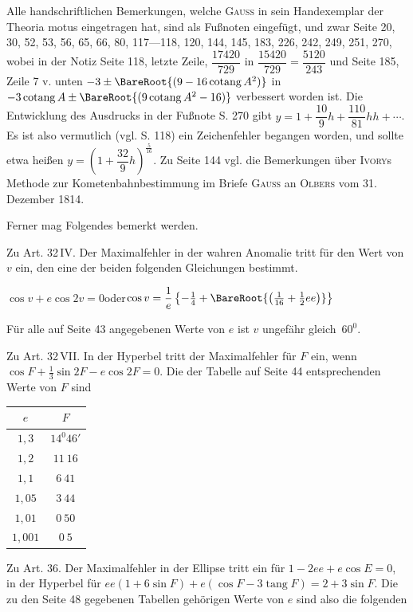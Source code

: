 Alle handschriftlichen Bemerkungen, welche \textsc{Gauss} in sein Handexemplar der
Theoria motus eingetragen hat, sind als Fußnoten eingefügt, und zwar Seite 20, 30, 52,
53, 56, 65, 66, 80, 117---118, 120, 144, 145, 183, 226, 242, 249, 251, 270, wobei in der
Notiz Seite 118, letzte Zeile, $\dfrac{17420}{729}$ in $\dfrac{15420}{729} =
\dfrac{5120}{243}$ und Seite 185, Zeile 7 v. unten $-3 \pm \BareRoot{(9-16\operatorname{cotang} A^2)}$ in
$-3\operatorname{cotang} A \pm \BareRoot{(9\operatorname{cotang} A^2-16)}$ verbessert worden ist. Die Entwicklung des
Ausdrucks in der Fußnote S. 270 gibt $y = 1 + \dfrac{10}{9}h + \dfrac{110}{81}hh +
\cdots$. Es ist also vermutlich (vgl. S. 118) ein Zeichenfehler begangen worden, und
sollte etwa heißen $y = \left(1+\dfrac{32}{9}h\right)^{\frac{5}{16}}$. Zu Seite 144
vgl. die Bemerkungen über \textsc{Ivory}s Methode zur Kometenbahnbestimmung im Briefe
\textsc{Gauss} an \textsc{Olbers} vom 31. Dezember 1814.

Ferner mag Folgendes bemerkt werden.

Zu Art. 32\,IV. Der Maximalfehler in der wahren Anomalie tritt für den Wert von $v$ ein,
den eine der beiden folgenden Gleichungen bestimmt.
\begin{center}
$\cos v + e\cos 2v = 0$\quad oder\quad \mbox{$\cos v = \dfrac1e\left\{
-\tfrac14 + \BareRoot{\left(\tfrac1{16}+\tfrac12 ee\right)}\right\}$}
\end{center}
Für alle auf
Seite 43 angegebenen Werte von $e$ ist $v$ ungefähr gleich~$60^0$.

Zu Art. 32\,VII. In der Hyperbel tritt der Maximalfehler für $F$ ein, wenn $\cos F +
\tfrac13\sin 2F - e\cos 2F = 0$. Die der Tabelle auf Seite 44 entsprechenden Werte von
$F$ sind

\begin{center}
\begin{tabular}{c|c}
$e$ & $F$ \\
\hline
$1{,}3$ & $14^0 46'$ \\
$1{,}2$ & $11\ 16$ \\
$1{,}1$ & $6\ 41$ \\
$1{,}05$ & $3\ 44$ \\
$1{,}01$ & $0\ 50$ \\
$1{,}001$ & $0\ 5$ \\
\end{tabular}
\end{center}

Zu Art. 36. Der Maximalfehler in der Ellipse tritt ein für $1-2ee+e\cos E = 0$, in der
Hyperbel für $ee(1+6\sin F)+e(\cos F-3\operatorname{tang} F) = 2+3\sin F$. Die zu den Seite 48
gegebenen Tabellen gehörigen Werte von $e$ sind also die folgenden


